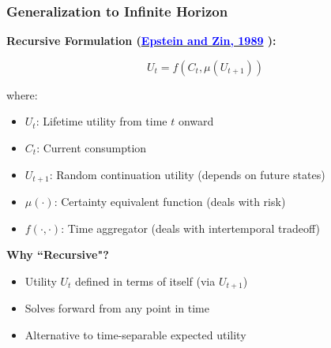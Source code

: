 \documentclass{beamer}
\begin{document}
\begin{frame}
    \frametitle{Generalization to Infinite Horizon}
    
    \textbf{Recursive Formulation (\href{https://doi.org/10.1142/9789814417358_0012}{\textcolor{blue}{Epstein and Zin, 1989}} ):}
    
    \begin{tcolorbox}[colback=blue!5!white, colframe=blue!75!black, title=Recursive Utility]
    \begin{equation*}
        U_t = f(C_t, \mu(U_{t+1}))
    \end{equation*}
    \end{tcolorbox}
    
    
    where:
    \begin{itemize}
        \item $U_t$: Lifetime utility from time $t$ onward
        \item $C_t$: Current consumption
        \item $U_{t+1}$: Random continuation utility (depends on future states)
        \item $\mu(\cdot)$: Certainty equivalent function (deals with risk)
        \item $f(\cdot, \cdot)$: Time aggregator (deals with intertemporal tradeoff)
    \end{itemize}
    
    
    \textbf{Why ``Recursive"?}
    \begin{itemize}
        \item Utility $U_t$ defined in terms of itself (via $U_{t+1}$)
        \item Solves forward from any point in time
        \item Alternative to time-separable expected utility
    \end{itemize}
    
\end{frame}
\end{document}
